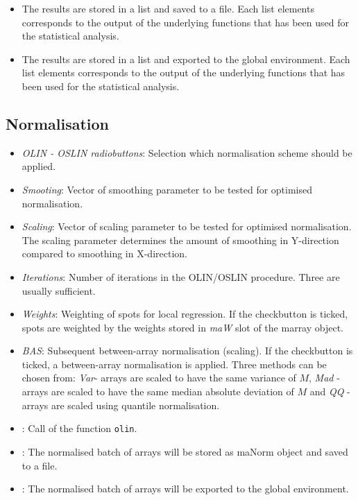 \documentclass[a4paper,11pt]{article}
\begin{document}
\begin{itemize}
\item {}  The results are stored in a list and saved to a file. Each list elements corresponds to
the output of the underlying functions that has been used for the statistical analysis.  

\item {}  The results are stored in a list and exported to the global environment.
 Each list elements corresponds to
the output of the underlying functions that has been used for the statistical analysis.  



\end{itemize}


\subsection{Normalisation}
\begin{itemize}
\item \textit{OLIN - OSLIN radiobuttons}: Selection which normalisation scheme should be applied.

\item \textit{Smooting}: Vector of smoothing parameter to be tested for optimised normalisation. 

\item \textit{Scaling}: Vector of scaling parameter to be tested for optimised normalisation.
The scaling  parameter determines the amount of smoothing in Y-direction compared to smoothing
in X-direction.  

\item \textit{Iterations}: Number of iterations in the  OLIN/OSLIN procedure. Three are usually sufficient. 

\item \textit{Weights}: Weighting of spots for local regression. If the checkbutton is ticked,
spots are weighted by the weights stored in \textit{maW} slot of the marray object.

\item \textit{BAS}: Subsequent between-array normalisation (scaling). If the checkbutton is ticked,
a between-array normalisation is applied. Three methods can be chosen from: \textit{Var}- arrays
are scaled to have the same variance of $M$,   \textit{Mad} - arrays are scaled to have the same
median absolute deviation of $M$ and \textit{QQ} - arrays are scaled using quantile normalisation. 

\item {}: Call of the function \texttt{olin}.

\item {}: The normalised batch of arrays will be stored as maNorm object and saved to a file.


\item {}: The normalised batch of arrays will be exported to the global environment.

\end{itemize}
\end{document}
